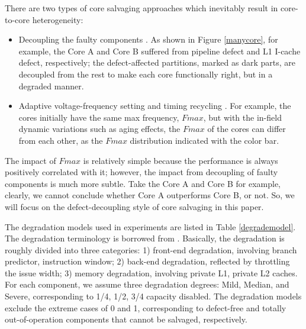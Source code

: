 There are two types of core salvaging approaches which inevitably result in core-to-core heterogeneity:
\begin{itemize}
    \item Decoupling the faulty components \cite{salvaging}. As shown in Figure \ref{manycore}, for example, the Core A and Core B suffered from pipeline defect and L1 I-cache defect, respectively; the defect-affected partitions, marked as dark parts,  are decoupled from the rest to make each core functionally right, but in a degraded manner.
    \item Adaptive voltage-frequency setting \cite{tschanz201045nm} and timing recycling \cite{ReviveNet}\cite{Recycle_07}. For example, the cores initially have the same max frequency, $Fmax$, but with the in-field dynamic variations such as aging effects, the $Fmax$ of the cores can differ from each other, as the $Fmax$ distribution indicated with the color bar.
\end{itemize}

The impact of $Fmax$ is relatively simple because the performance is always positively correlated with it; however, the impact  from decoupling of faulty components is much more subtle. Take the Core A and Core B for example, clearly, we cannot conclude whether Core A  outperforms Core B, or not. So, we will focus on the defect-decoupling style of core salvaging in this paper.

The degradation models used in experiments are listed in Table \ref{degrademodel}. The degradation terminology is borrowed from \cite{flicker}. Basically, the degradation is roughly divided  into three categories: 1) front-end degradation, involving branch predictor, instruction window; 2) back-end degradation, reflected by throttling the issue width;  3) memory degradation, involving private L1, private L2 caches.  For each component, we assume three degradation degrees: Mild, Median, and Severe, corresponding to 1/4, 1/2, 3/4 capacity disabled.  The degradation models exclude  the extreme cases of 0 and 1, corresponding to defect-free and  totally out-of-operation components that cannot be salvaged, respectively.

